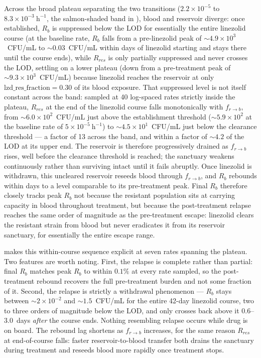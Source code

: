 \documentclass[11pt]{article}
\begin{document}
Across the broad plateau separating the two transitions ($2.2\times10^{-5}$
to $8.3\times10^{-3}~\mathrm{h}^{-1}$, the salmon-shaded band in
), blood and reservoir diverge: once
established, $R_b$ is suppressed below the LOD for essentially the entire
linezolid course (at the baseline rate, $R_b$ falls from a pre-linezolid peak
of $\sim4.9\times10^3$~CFU/mL to $\sim0.03$~CFU/mL within days of linezolid
starting and stays there until the course ends), while $R_{res}$ is only
partially suppressed and never crosses the LOD, settling on a lower plateau
(down from a pre-treatment peak of $\sim9.3\times10^3$~CFU/mL) because
linezolid reaches the reservoir at only
$\mathrm{lzd\_res\_fraction} = 0.30$ of its blood exposure. That suppressed
level is not itself constant across the band: sampled at 40 log-spaced rates
strictly inside the plateau, $R_{res}$ at the end of the linezolid course
falls monotonically with $f_{r \to b}$, from $\sim6.0\times10^2$~CFU/mL just
above the establishment threshold ($\sim5.9\times10^2$ at the baseline rate
of $5\times10^{-5}~\mathrm{h}^{-1}$) to $\sim4.5\times10^1$~CFU/mL just below
the clearance threshold --- a factor of 13 across the band, and within a
factor of $\sim4.2$ of the LOD at its upper end. The reservoir is therefore
progressively drained as $f_{r \to b}$ rises, well before the clearance
threshold is reached; the sanctuary weakens continuously rather than
surviving intact until it fails abruptly. Once linezolid is
withdrawn, this uncleared reservoir reseeds blood through $f_{r \to b}$, and
$R_b$ rebounds within days to a level comparable to its pre-treatment peak.
Final $R_b$ therefore closely tracks peak $R_b$ not because the resistant
population sits at carrying capacity in blood throughout treatment, but
because the post-treatment relapse reaches the same order of magnitude as the
pre-treatment escape: linezolid clears the resistant strain from blood but
never eradicates it from its reservoir sanctuary, for essentially the entire
escape range.

 makes this within-course sequence explicit at
seven rates spanning the plateau. Two features are worth noting. First, the
relapse is complete rather than partial: final $R_b$ matches peak $R_b$ to
within $0.1\%$ at every rate sampled, so the post-treatment
rebound recovers the full pre-treatment burden and not some fraction of it.
Second, the relapse is strictly a withdrawal phenomenon --- $R_b$ stays
between $\sim2\times10^{-2}$ and $\sim1.5$~CFU/mL for the entire 42-day linezolid
course, two to three orders of magnitude below the LOD, and only crosses
back above it 0.6--3.0~days \textit{after} the course ends. Nothing
resembling relapse occurs while drug is on board. The rebound lag shortens
as $f_{r \to b}$ increases, for the same reason $R_{res}$ at end-of-course
falls: faster reservoir-to-blood transfer both drains the sanctuary during
treatment and reseeds blood more rapidly once treatment stops.
\end{document}
